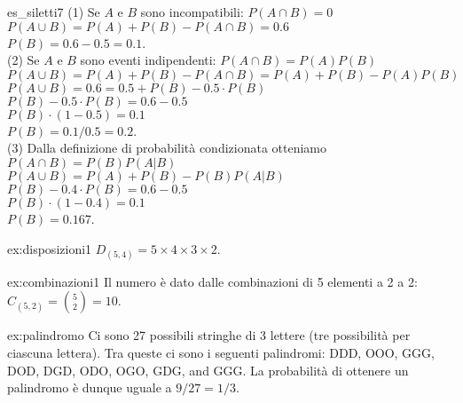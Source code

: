
\begin{sol}{es_siletti7}
(1) Se $A$ e $B$ sono incompatibili: $P(A \cap B)  = 0$\\
$P(A \cup B) = P(A) + P(B) − P(A \cap B) = 0.6$\\
$P(B) = 0.6 − 0.5 = 0.1$. \\
(2) Se $A$ e $B$ sono eventi indipendenti: $P(A \cap B) = P(A)P(B)$ \\
$P(A \cup B) = P(A) + P(B) − P(A \cap B) = P(A) + P(B) − P(A) P(B)$ \\
$P(A \cup B) = 0.6 = 0.5 + P(B) − 0.5 \cdot P(B)$ \\
$P(B) − 0.5 \cdot P(B) = 0.6 − 0.5$ \\
$P(B) \cdot (1 − 0.5) = 0.1$ \\
$P(B) = 0.1/0.5 = 0.2$.\\
(3) 
Dalla definizione di probabilità condizionata otteniamo \\
$P(A \cap B) = P(B) P(A | B)$\\ 
$P(A \cup B) = P(A) + P(B) − P(B) P(A|B)$\\ 
$P(B) − 0.4 \cdot P(B) = 0.6 −0.5$\\
$P(B) \cdot (1 − 0.4) = 0.1$\\ 
$P(B) = 0.167$. 
\end{sol}


\begin{sol}{ex:disposizioni1}
$D_{(5,4)} = 5\times4\times3\times2$.
\end{sol}


\begin{sol}{ex:combinazioni1}
Il numero è dato dalle combinazioni di 5 elementi a 2 a 2:
$C_{(5,2)} = \binom{5}{2} = 10$.
\end{sol}



\begin{sol}{ex:palindromo}
Ci sono  27 possibili stringhe di 3 lettere (tre possibilità per ciascuna lettera). Tra queste ci sono i seguenti palindromi: DDD, OOO, GGG, DOD, DGD, ODO, OGO, GDG, and GGG. La probabilità di ottenere un palindromo è dunque uguale a $9/27 = 1/3$.
\end{sol}

